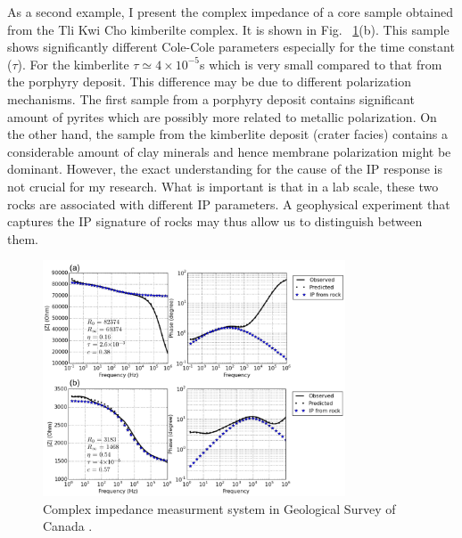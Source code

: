 \documentclass[letterpaper,11pt]{article}
\begin{document}

 As a second example, I present the complex impedance of a core sample obtained from the Tli Kwi Cho kimberilte complex. It is shown in Fig. ~\ref{Fig:obsimpedance}(b). This sample shows significantly different Cole-Cole parameters especially for the time constant ($\tau$). For the kimberlite $\tau \simeq 4\times10^{-5}$s which is very small compared to that from the porphyry deposit. This difference may be due to different polarization mechanisms. The first sample from a porphyry deposit contains significant amount of pyrites which are possibly more related to metallic polarization. On the other hand, the sample from the kimberlite deposit (crater facies) contains a considerable amount of clay minerals and hence membrane polarization might be dominant. However, the exact understanding for the cause of the IP response is not crucial for my research. What is important is that in a lab scale, these two rocks are associated with different IP parameters.  A geophysical experiment that captures the IP signature of rocks may thus allow us to distinguish between them. 

\begin{figure}[htb]
  \centering
  \includegraphics[width=0.8\textwidth]{figures/obsimpedance.png}
  \caption{Complex impedance measurment system in Geological Survey of Canada \cite[]{Enkin2012}. }
  \label{Fig:obsimpedance}
\end{figure}
\clearpage
\end{document}
